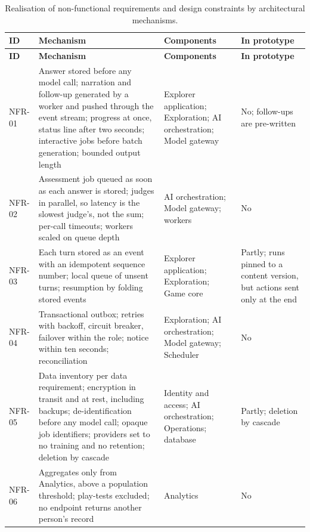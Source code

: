 {\small
\begin{longtable}{|>{\raggedright\arraybackslash}p{}|>{\raggedright\arraybackslash}p{}|>{\raggedright\arraybackslash}p{}|>{\raggedright\arraybackslash}p{}|}
\caption{Realisation of non-\allowbreak{}functional requirements and design constraints by architectural mechanisms.} \\
\hline
\textbf{ID} & \textbf{Mechanism} & \textbf{Components} & \textbf{In prototype} \\ \hline
\endfirsthead
\hline
\textbf{ID} & \textbf{Mechanism} & \textbf{Components} & \textbf{In prototype} \\ \hline
\endhead
NFR-01 & Answer stored before any model call; narration and follow-up generated by a worker and pushed through the event stream; progress at once, status line after two seconds; interactive jobs before batch generation; bounded output length & Explorer application; Exploration; AI orchestration; Model gateway & No; follow-ups are pre-written \\ \hline
NFR-02 & Assessment job queued as soon as each answer is stored; judges in parallel, so latency is the slowest judge's, not the sum; per-call timeouts; workers scaled on queue depth & AI orchestration; Model gateway; workers & No \\ \hline
NFR-03 & Each turn stored as an event with an idempotent sequence number; local queue of unsent turns; resumption by folding stored events & Explorer application; Exploration; Game core & Partly; runs pinned to a content version, but actions sent only at the end \\ \hline
NFR-04 & Transactional outbox; retries with backoff, circuit breaker, failover within the role; notice within ten seconds; reconciliation & Exploration; AI orchestration; Model gateway; Scheduler & No \\ \hline
NFR-05 & Data inventory per data requirement; encryption in transit and at rest, including backups; de-\allowbreak{}identification before any model call; opaque job identifiers; providers set to no training and no retention; deletion by cascade & Identity and access; AI orchestration; Operations; database & Partly; deletion by cascade \\ \hline
NFR-06 & Aggregates only from Analytics, above a population threshold; play-tests excluded; no endpoint returns another person's record & Analytics & No \\ \hline

\end{longtable}}
